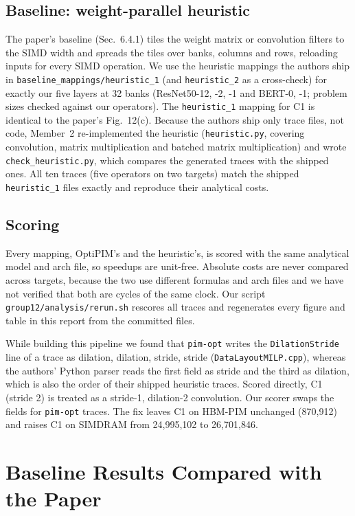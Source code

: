 \documentclass[conference]{IEEEtran}
\begin{document}
\subsection{Baseline: weight-parallel heuristic}
The paper's baseline (Sec.~6.4.1) tiles the weight matrix or convolution
filters to the SIMD width and spreads the tiles over banks, columns and rows,
reloading inputs for every SIMD operation. We use the heuristic mappings the
authors ship in \texttt{baseline\_mappings/heuristic\_1} (and
\texttt{heuristic\_2} as a cross-check) for exactly our five layers at 32 banks
(ResNet50-12, -2, -1 and BERT-0, -1; problem sizes checked against our
operators). The \texttt{heuristic\_1} mapping for C1 is identical to the
paper's Fig.~12(c). Because the authors ship only trace files, not code, Member~2 re-implemented the
heuristic (\texttt{heuristic.py}, covering convolution, matrix multiplication and batched matrix multiplication)
and wrote \texttt{check\_heuristic.py}, which compares the generated traces with the shipped ones. All ten traces
(five operators on two targets) match the shipped \texttt{heuristic\_1} files exactly and reproduce their analytical costs.

\subsection{Scoring}
Every mapping, OptiPIM's and the heuristic's, is scored with the same
analytical model and arch file, so speedups are unit-free. Absolute costs are
never compared across targets, because the two use different formulas and
arch files and we have not verified that both are cycles of the same clock.
Our script \texttt{group12/analysis/rerun.sh} rescores all traces and
regenerates every figure and table in this report from the committed files.

While building this pipeline we found that \texttt{pim-opt} writes the
\texttt{DilationStride} line of a trace as dilation, dilation, stride, stride
(\texttt{DataLayoutMILP.cpp}), whereas the authors' Python parser reads the
first field as stride and the third as dilation, which is also the order of
their shipped heuristic traces. Scored directly, C1 (stride 2) is treated as a
stride-1, dilation-2 convolution. Our scorer swaps the fields for
\texttt{pim-opt} traces. The fix leaves C1 on HBM-PIM unchanged (870{,}912) and
raises C1 on SIMDRAM from 24{,}995{,}102 to 26{,}701{,}846.

\section{Baseline Results Compared with the Paper}
\end{document}
